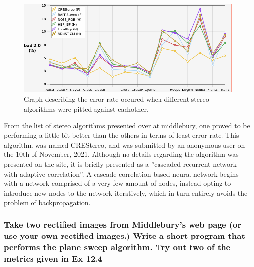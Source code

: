 \documentclass[a4paper, titlepage,12pt]{article}
\begin{document}
	\begin{figure}[H]
		\begin{center}
			\includegraphics[scale=0.5]{./stereo_stats.png}
			\caption{Graph describing the error rate occured when different stereo algorithms were pitted against eachother.}
		\end{center}
	\end{figure}

	From the list of stereo algorithms presented over at middlebury, one proved to be performing a little bit better than the others in terms of least error rate. This algorithm was named CREStereo, and was submitted by an anonymous user on the 10th of November, 2021. Although no details regarding the algorithm was presented on the site, it is briefly presented as a ''cascaded recurrent network with adaptive correlation''\cite{crestereo}. A cascade-correlation based neural network begins with a network comprised of a very few amount of nodes, instead opting to introduce new nodes to the network iteratively, which in turn entirely avoids the problem of backpropagation.\cite{cascade-correlation}

	\subsubsection*{Take two rectified images from Middlebury’s web page (or use your own rectified images.) Write a short program that performs the plane sweep algorithm. Try out two of the metrics given in Ex 12.4}
\end{document}
